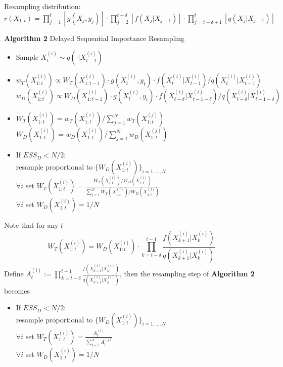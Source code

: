 \documentclass{article}
\begin{document}
\vspace{1cm}
\noindent Resampling distribution: $r(X_{1:t})= \prod_{j=1}^{t} [ g(X_j, y_j) ]
                                   \cdot \prod_{j=2}^{t-\delta} [ f(X_j | X_{j-1} ) ]
                                   \cdot \prod_{j=t-\delta+1}^{t} [ q(X_j | X_{j-1} ) ]$
\vspace{1cm}

\textbf{Algorithm 2} Delayed Sequential Importance Resampling
\begin{itemize}
\item Sample $X_t^{(i)} \sim q( \cdot | X_{t-1}^{(i)})$
\item $w_T(X_{1:t}^{(i)}) \propto W_T(X_{1:t-1}^{(i)}) \cdot g(X_t^{(i)}, y_t) \cdot
  f(X_t^{(i)} | X_{t-1}^{(i)}) / q(X_t^{(i)} | X_{t-1}^{(i)})$\\
  $w_D(X_{1:t}^{(i)}) \propto W_D(X_{1:t-1}^{(i)}) \cdot g(X_t^{(i)}, y_t) \cdot
  f(X_{t-\delta}^{(i)} | X_{t-1-\delta}^{(i)}) / q(X_{t-\delta}^{(i)} | X_{t-1-\delta}^{(i)})$
\item $W_T(X_{1:t}^{(i)}) = w_T(X_{1:t}^{(i)}) / \sum_{j=1}^N w_T(X_{1:t}^{(j)})$\\
  $W_D(X_{1:t}^{(i)}) = w_D(X_{1:t}^{(i)}) / \sum_{j=1}^N w_D(X_{1:t}^{(j)})$
\item If $ESS_D < N/2$:\\
  resample proportional to $\{W_D(X_{1:t}^{(i)})\}_{i=1,...,N}$\\
  $\forall i$ set $W_T(X_{1:t}^{(i)}) = \frac{W_T(X_{1:t}^{(i)})/W_D(X_{1:t}^{(i)})} {\sum_{j=1}^N W_T(X_{1:t}^{(j)})/W_D(X_{1:t}^{(j)})}$\\
  $\forall i$ set $W_D(X_{1:t}^{(i)}) = 1/N$\\
\end{itemize}

\vspace{1cm}

\noindent Note that for any $t$
$$W_T(X_{1:t}^{(i)}) = W_D(X_{1:t}^{(i)}) \cdot \prod_{k=t-\delta}^{t-1} \frac{ f(X_{k+1}^{(i)} | X_{k}^{(i)}) }{ q(X_{k+1}^{(i)} | X_{k}^{(i)}) }$$
\noindent Define $A_t^{(i)} := \prod_{k=t-\delta}^{t-1} \frac{ f(X_{k+1}^{(i)} | X_{k}^{(i)}) }{ q(X_{k+1}^{(i)} | X_{k}^{(i)}) }$, then 
the resampling step of \textbf{Algorithm 2} becomes
\begin{itemize}
\item If $ESS_D < N/2$:\\
  resample proportional to $\{W_D(X_{1:t}^{(i)})\}_{i=1,...,N}$\\
  $\forall i$ set $W_T(X_{1:t}^{(i)}) = \frac{ A_t^{(i)} } { \sum_{j=1}^N A_t^{(j)} }$\\
  $\forall i$ set $W_D(X_{1:t}^{(i)}) = 1/N$\\
\end{itemize}
\end{document}
